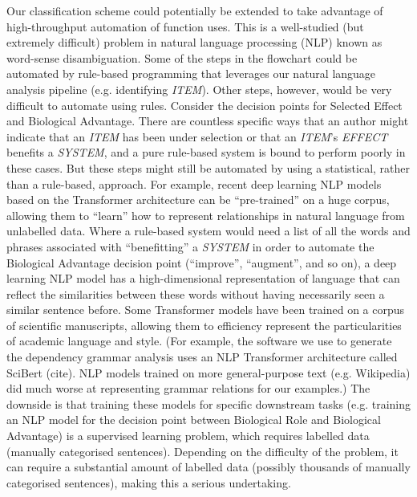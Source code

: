 \documentclass{article}
\begin{document}
Our classification scheme could potentially be extended to take advantage of high-throughput automation of function uses.
This is a well-studied (but extremely difficult) problem in natural language processing (NLP) known as word-sense disambiguation.
Some of the steps in the flowchart could be automated by rule-based programming that leverages our natural language analysis pipeline (e.g. identifying \emph{ITEM}).
Other steps, however, would be very difficult to automate using rules.
Consider the decision points for Selected Effect and Biological Advantage.
There are countless specific ways that an author might indicate that an \emph{ITEM} has been under selection or that an \emph{ITEM}'s \emph{EFFECT} benefits a \emph{SYSTEM}, and a pure rule-based system is bound to perform poorly in these cases.
But these steps might still be automated by using a statistical, rather than a rule-based, approach.
For example, recent deep learning NLP models based on the Transformer architecture can be ``pre-trained'' on a huge corpus, allowing them to ``learn'' how to represent relationships in natural language from unlabelled data.
Where a rule-based system would need a list of all the words and phrases associated with ``benefitting'' a \emph{SYSTEM} in order to automate the Biological Advantage decision point (``improve'', ``augment'', and so on), a deep learning NLP model has a high-dimensional representation of language that can reflect the similarities between these words without having necessarily seen a similar sentence before.
Some Transformer models have been trained on a corpus of scientific manuscripts, allowing them to efficiency represent the particularities of academic language and style.
(For example, the software we use to generate the dependency grammar analysis uses an NLP Transformer architecture called SciBert (cite). NLP models trained on more general-purpose text (e.g. Wikipedia) did much worse at representing grammar relations for our examples.)
The downside is that training these models for specific downstream tasks (e.g. training an NLP model for the decision point between Biological Role and Biological Advantage) is a supervised learning problem, which requires labelled data (manually categorised sentences).
Depending on the difficulty of the problem, it can require a substantial amount of labelled data (possibly thousands of manually categorised sentences), making this a serious undertaking.
\end{document}
